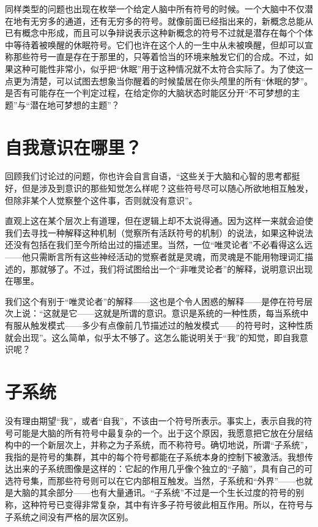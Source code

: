 同样类型的问题也出现在枚举一个给定人脑中所有符号的时候。一个大脑中不仅潜在地有无穷多的通道，还有无穷多的符号。就像前面已经指出来的，新概念总能从已有概念中形成，而且可以争辩说表示这种新概念的符号不过就是潜存在每个个体中等待着被唤醒的休眠符号。它们也许在这个人的一生中从未被唤醒，但却可以宣称那些符号一直是存在于那里的，只等着恰当的环境来触发它们的合成。不过，如果这种可能性非常小，似乎把“休眠”用于这种情况就不太符合实际了。为了使这一点更为清楚，可以试图去想象当你醒着的时候蛰居在你头颅里的所有“休眠的梦”。是否有可能存在一个判定过程，在给定你的大脑状态时能区分开“不可梦想的主题”与“潜在地可梦想的主题”？

\section{自我意识在哪里？}

回顾我们讨论过的问题，你也许会自言自语，“这些关于大脑和心智的思考都挺好，但是涉及到意识的那些知觉怎么样呢？这些符号尽可以随心所欲地相互触发，但除非某个人觉察整个这件事，否则就没有意识”。

直观上这在某个层次上有道理，但在逻辑上却不太说得通。因为这样一来就会迫使我们去寻找一种解释这种机制（觉察所有活跃符号的机制）的说法，如果这种说法还没有包括在我们至今所给出过的描述里。当然，一位“唯灵论者”不必看得这么远——他只需断言所有这些神经活动的觉察者就是灵魂，而灵魂是不能用物理词汇描述的，那就够了。不过，我们将试图给出一个“非唯灵论者”的解释，说明意识出现在哪里。

我们这个有别于“唯灵论者”的解释——这也是个令人困惑的解释——是停在符号层次上说：“这就是它——这就是所谓的意识。意识是系统的一种性质，每当系统中有服从触发模式——多少有点像前几节描述过的触发模式——的符号时，这种性质就会出现”。这么简单，似乎太不够了。这怎么能说明关于“我”的知觉，即自我意识呢？

\section{子系统}

没有理由期望“我”，或者“自我”，不该由一个符号所表示。事实上，表示自我的符号可能是大脑的所有符号中最复杂的一个。出于这个原因，我愿意把它放在分层结构中的一个新层次上，并称之为子系统，而不称符号。确切地说，所谓“子系统”，我指的是符号的集群，其中的每个符号都能在子系统本身的控制下被激活。我想传达出来的子系统图像是这样的：它起的作用几乎像个独立的“子脑”，具有自己的可选符号集，而那些符号则可以在它内部相互触发。当然，子系统和“外界”——也就是大脑的其余部分——也有大量通讯。“子系统”不过是一个生长过度的符号的别称，这种符号已变得非常复杂，其中有许多子符号彼此相互作用。所以，在符号与子系统之间没有严格的层次区别。


